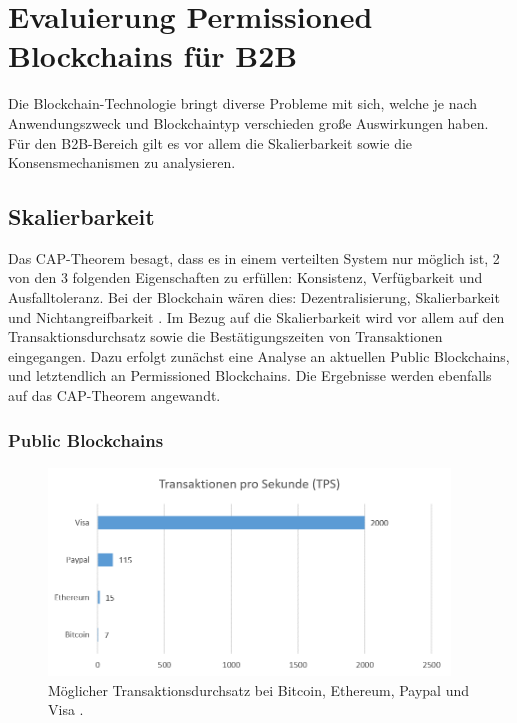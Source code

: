 \chapter{Evaluierung Permissioned Blockchains für B2B}
\label{cha:b2b-eval}

Die Blockchain-Technologie bringt diverse Probleme mit sich, welche je nach Anwendungszweck und Blockchaintyp verschieden große Auswirkungen haben. Für den B2B-Bereich gilt es vor allem die Skalierbarkeit sowie die Konsensmechanismen zu analysieren.


\section{Skalierbarkeit}
\label{sec:scalability-eval}
Das CAP-Theorem besagt, dass es in einem verteilten System nur möglich ist, 2 von den 3 folgenden Eigenschaften zu erfüllen: Konsistenz, Verfügbarkeit und Ausfalltoleranz. Bei der Blockchain wären dies: Dezentralisierung, Skalierbarkeit und Nichtangreifbarkeit \cite{SchererPerformanceScalabilityBlockchain2017}. Im Bezug auf die Skalierbarkeit wird vor allem auf den Transaktionsdurchsatz sowie die Bestätigungszeiten von Transaktionen eingegangen. Dazu erfolgt zunächst eine Analyse an aktuellen Public Blockchains, und letztendlich an Permissioned Blockchains. Die Ergebnisse werden ebenfalls auf das CAP-Theorem angewandt.  

\subsection{Public Blockchains}

\begin{figure}[htb]
  \centering
    \includegraphics[width=0.95\textwidth,angle=0]{images/tps-comparison}
     \caption{Möglicher Transaktionsdurchsatz bei Bitcoin, Ethereum, Paypal und Visa \cite{ScalabilityBitcoinWiki}.}
    \label{fig:tps-comparison}
\end{figure}

